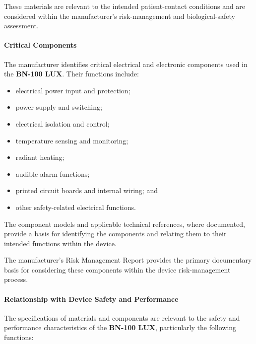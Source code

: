 These materials are relevant to the intended patient-contact
conditions and are considered within the manufacturer's
risk-management and biological-safety assessment.

\paragraph{Critical Components}

The manufacturer identifies critical electrical and electronic
components used in the \textbf{BN-100 LUX}. Their functions include:

\begin{itemize}
    \item electrical power input and protection;
    \item power supply and switching;
    \item electrical isolation and control;
    \item temperature sensing and monitoring;
    \item radiant heating;
    \item audible alarm functions;
    \item printed circuit boards and internal wiring; and
    \item other safety-related electrical functions.
\end{itemize}

The component models and applicable technical references, where
documented, provide a basis for identifying the components and
relating them to their intended functions within the device.

The manufacturer's Risk Management Report provides the primary
documentary basis for considering these components within the
device risk-management process.

\paragraph{Relationship with Device Safety and Performance}

The specifications of materials and components are relevant to the
safety and performance characteristics of the
\textbf{BN-100 LUX}, particularly the following functions:


